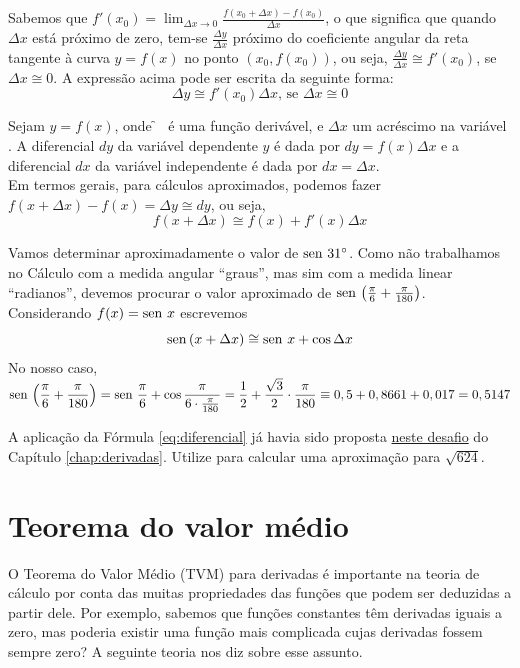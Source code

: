 \cleardoublepage\documentclass[../main.tex]{subfiles}
\begin{document}
Sabemos que $f'(x_0)=\lim_{\Delta x\to 0} \frac{f(x_0+\Delta x)-f(x_0)}{\Delta x}$, o que significa que quando $\Delta x$ está próximo de zero, tem-se $\frac{\Delta y}{\Delta x}$ próximo do coeficiente angular da reta tangente à curva $y= f(x)$ no ponto $(x_0,f(x_0))$, ou seja, $\frac{\Delta y}{\Delta x}\cong f'(x_0)$, se $\Delta x\cong 0$.
A expressão acima pode ser escrita da seguinte forma:
\begin{equation*}
   \Delta y\cong f'(x_0)\Delta x\textrm{, se }\Delta x\cong 0
\end{equation*}
\begin{framed}
\begin{definition}
Sejam $y= f(x)$, onde \f~ é uma função derivável, e $\Delta x$ um acréscimo na variável \x. A diferencial $dy$ da variável dependente $y$ é dada por $dy=f(x)\Delta x$ e a diferencial $dx$ da variável independente \x é dada por $dx=\Delta x$.\\
Em termos gerais, para cálculos aproximados, podemos fazer $f(x+\Delta x)-f(x)=\Delta y \cong dy$, ou seja,
\begin{equation}
    f(x+\Delta x)\cong f(x)+f'(x)\Delta x\label{eq:diferencial}
\end{equation}
\end{definition}
\end{framed}
\begin{ex}
  Vamos determinar aproximadamente o valor de $\operatorname{sen}\, 31^\circ$. Como não trabalhamos no
Cálculo com a medida angular ``graus'', mas sim com a medida linear ``radianos'', devemos procurar o valor aproximado de $\operatorname{sen}\,\left(\frac{\pi}{6}+\frac{\pi}{180}\right)$. Considerando $f(x)=\operatorname{sen}\, x$ escrevemos
\begin{equation*}
    \operatorname{sen}\,(x+\Delta x)\cong\operatorname{sen}\, x+\cos\Delta x
\end{equation*}
No nosso caso,\\ $\displaystyle\operatorname{sen}\,\left(\frac{\pi}{6}+\frac{\pi}{180}\right)=\operatorname{sen}\,\frac{\pi}{6}+\cos\frac{\pi}{6\cdot \frac{\pi}{180}}=\frac{1}{2}+\frac{\sqrt{3}}{2}\cdot \frac{\pi}{180}\equiv 0,5+0,8661+0,017=0,5147$
  \end{ex}
  \begin{obs}
    A aplicação da Fórmula \ref{eq:diferencial} já havia sido proposta  \hyperlink{desafio}{neste desafio} do Capítulo \ref{chap:derivadas}. Utilize para calcular uma aproximação para $\sqrt{624}$.
  \end{obs}
  
\section{Teorema do valor médio}\hypertarget{TeoValorMedio}{}\label{sec:TVM}
O Teorema do Valor Médio (TVM) para derivadas é importante na teoria de cálculo por conta das muitas propriedades das funções que podem ser deduzidas a partir dele. Por exemplo, sabemos que funções constantes têm derivadas iguais a zero, mas poderia existir uma função mais complicada cujas derivadas fossem sempre zero? A seguinte teoria nos diz sobre esse assunto.
\end{document}
